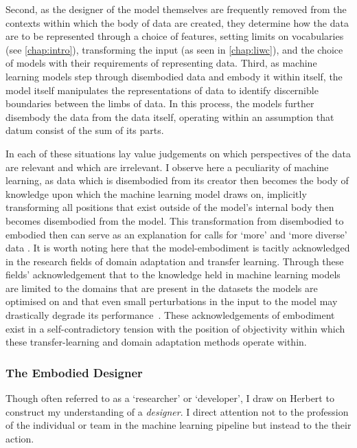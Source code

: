Second, as the designer of the model themselves are frequently removed from the contexts within which the body of data are created, they determine how the data are to be represented through a choice of features, setting limits on vocabularies (see \autoref{chap:intro}), transforming the input (as seen in \autoref{chap:liwc}), and the choice of models with their requirements of representing data.
Third, as machine learning models step through disembodied data and embody it within itself, the model itself manipulates the representations of data to identify discernible boundaries between the limbs of data. In this process, the models further disembody the data from the data itself, operating within an assumption that datum consist of the sum of its parts.

In each of these situations lay value judgements on which perspectives of the data are relevant and which are irrelevant. I observe here a peculiarity of machine learning, as data which is disembodied from its creator then becomes the body of knowledge upon which the machine learning model draws on, implicitly transforming all positions that exist outside of the model's internal body then becomes disembodied from the model. This transformation from disembodied to embodied then can serve as an explanation for calls for `more' and `more diverse' data \citep{Holstein:2019}.
It is worth noting here that the model-embodiment is tacitly acknowledged in the research fields of domain adaptation \citep{Daume:2007} and transfer learning. Through these fields' acknowledgement that to the knowledge held in machine learning models are limited to the domains that are present in the datasets the models are optimised on and that even small perturbations in the input to the model may drastically degrade its performance~\citep{Szegedy:2014,Daume:2007}. These acknowledgements of embodiment exist in a self-contradictory tension with the position of objectivity within which these transfer-learning and domain adaptation methods operate within.

\subsubsection{The Embodied Designer}

Though often referred to as a `researcher' or `developer', I draw on Herbert \citet{Simon:1969} to construct my understanding of a \textit{designer}. I direct attention not to the profession of the individual or team in the machine learning pipeline but instead to the their action.

